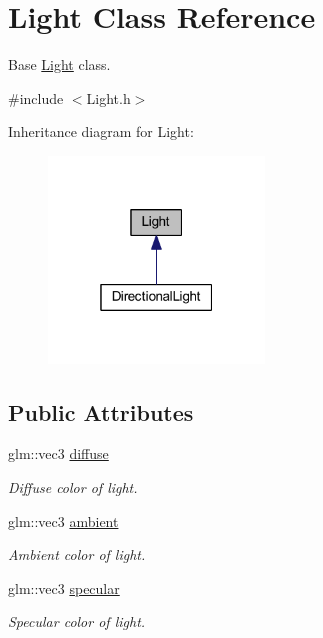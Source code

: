 \hypertarget{class_light}{}\section{Light Class Reference}
\label{class_light}


Base \mbox{\hyperlink{class_light}{Light}} class.  




{\ttfamily \#include $<$Light.\+h$>$}



Inheritance diagram for Light\+:
\nopagebreak
\begin{figure}[H]
\begin{center}
\leavevmode
\includegraphics[width=163pt]{class_light__inherit__graph}
\end{center}
\end{figure}
\subsection*{Public Attributes}
\begin{DoxyCompactItemize}
\item 
glm\+::vec3 \mbox{\hyperlink{class_light_ad47b5347556fd8cd9ebdc60fdfed196b}{diffuse}}
\begin{DoxyCompactList}\small\item\em Diffuse color of light. \end{DoxyCompactList}\item 
glm\+::vec3 \mbox{\hyperlink{class_light_afaa34bb2efc167adcb2055359fd08a49}{ambient}}
\begin{DoxyCompactList}\small\item\em Ambient color of light. \end{DoxyCompactList}\item 
glm\+::vec3 \mbox{\hyperlink{class_light_aefcfb83a0540ddb885c2622061b28d7e}{specular}}
\begin{DoxyCompactList}\small\item\em Specular color of light. \end{DoxyCompactList}\end{DoxyCompactItemize}


